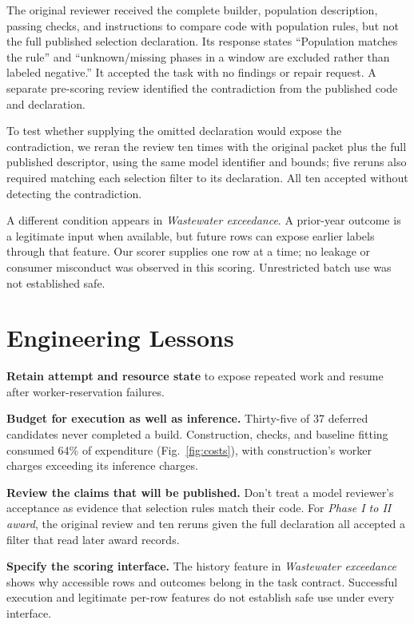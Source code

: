 \documentclass[conference,10pt,letterpaper]{IEEEtran}
\begin{document}
The original reviewer received the complete builder, population description, passing checks, and instructions to compare code with population rules, but not the full published selection declaration. Its response states ``Population matches the rule'' and ``unknown/missing phases in a window are excluded rather than labeled negative.'' It accepted the task with no findings or repair request. A separate pre-scoring review identified the contradiction from the published code and declaration.

To test whether supplying the omitted declaration would expose the contradiction, we reran the review ten times with the original packet plus the full published descriptor, using the same model identifier and bounds; five reruns also required matching each selection filter to its declaration. All ten accepted without detecting the contradiction.

A different condition appears in \emph{Wastewater exceedance}. A prior-year outcome is a legitimate input when available, but future rows can expose earlier labels through that feature. Our scorer supplies one row at a time; no leakage or consumer misconduct was observed in this scoring. Unrestricted batch use was not established safe.

\section{Engineering Lessons}
\textbf{Retain attempt and resource state} to expose repeated work and resume after worker-reservation failures.

\textbf{Budget for execution as well as inference.} Thirty-five of 37 deferred candidates never completed a build. Construction, checks, and baseline fitting consumed 64\% of expenditure (Fig.~\ref{fig:costs}), with construction's worker charges exceeding its inference charges.

\textbf{Review the claims that will be published.} Don't treat a model reviewer's acceptance as evidence that selection rules match their code. For \emph{Phase I to II award}, the original review and ten reruns given the full declaration all accepted a filter that read later award records.

\textbf{Specify the scoring interface.} The history feature in \emph{Wastewater exceedance} shows why accessible rows and outcomes belong in the task contract. Successful execution and legitimate per-row features do not establish safe use under every interface.
\end{document}
